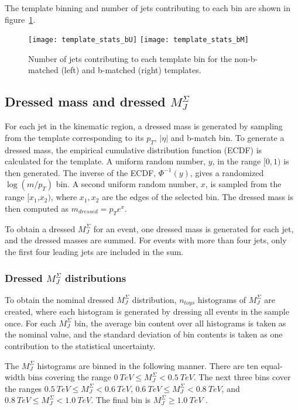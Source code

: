The template binning and number of jets contributing to each bin are shown in figure~\ref{fig:template_stats}.

\begin{figure}[!ht]
    \texttt{[image: template\_stats\_bU]}
    \texttt{[image: template\_stats\_bM]}
    \caption{Number of jets contributing to each template bin for the non-b-matched (left) and b-matched (right) templates.}
    \label{fig:template_stats}
\end{figure}

\subsection{Dressed mass and dressed $M_{J}^{\Sigma}$} \label{subsec:dressed_mj}
For each jet in the kinematic region, a dressed mass is generated by sampling from the template corresponding to its $p_T$, $|\eta|$ and b-match bin.
To generate a dressed mass, the empirical cumulative distribution function (ECDF) is calculated for the template.
A uniform random number, $y$, in the range $[0,1)$ is then generated.
The inverse of the ECDF, $\Phi^{-1}(y)$, gives a randomized $\log\left(m/p_T\right)$ bin.
A second uniform random number, $x$, is sampled from the range $[x_1$,$x_2)$, where $x_1,x_2$ are the edges of the selected bin.
The dressed mass is then computed as $m_{dressed} = p_{T}e^x$.

To obtain a dressed $M_{J}^{\Sigma}$ for an event, one dressed mass is generated for each jet, and the dressed masses are summed.
For events with more than four jets, only the first four leading jets are included in the sum.

\subsubsection{Dressed $M_{J}^{\Sigma}$ distributions}
To obtain the nominal dressed $M_{J}^{\Sigma}$ distribution, $n_{toys}$ histograms of $M_{J}^{\Sigma}$ are created, where each histogram is generated by dressing all events in the sample once.
For each $M_{J}^{\Sigma}$ bin, the average bin content over all histograms is taken as the nominal value, and the standard deviation of bin contents is taken as one contribution to the statistical uncertainty.

The $M_{J}^{\Sigma}$ histograms are binned in the following manner.
There are ten equal-width bins covering the range $0~TeV \leq M_{J}^{\Sigma} < 0.5~TeV$.
The next three bins cover the ranges $0.5~TeV \leq M_{J}^{\Sigma} < 0.6~TeV$, $0.6~TeV \leq M_{J}^{\Sigma} < 0.8~TeV$,
and $0.8~TeV \leq M_{J}^{\Sigma} < 1.0~TeV$.
The final bin is $M_{J}^{\Sigma} \geq 1.0~TeV$ .

